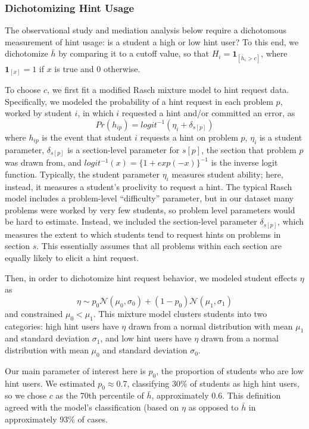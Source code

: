 \documentclass{article}\usepackage[]{graphicx}\usepackage[]{color}
\newcommand{\indicator}[1]{\mathbf{1}_{\left[ {#1} \right] }}
\begin{document}
\subsubsection{Dichotomizing Hint Usage}\label{sec:dichotomizingHintUsage}
The observational study and mediation analysis below require a dichotomous measurement of hint usage: is a
student a high or low hint user?
To this end, we dichotomize $\bar{h}$ by comparing it to a cutoff value, so
that $H_i=\indicator{\bar{h}_i>c}$, where $\indicator{x}=1$ if $x$ is true
and 0 otherwise.

To choose $c$, we first fit a modified Rasch mixture model
\citep{rasch} to hint request data.
Specifically, we modeled the probability of a hint request in each problem
$p$, worked by student $i$, in which $i$ requested a hint and/or
committed an error, as
\begin{equation}\label{eq:rasch}
Pr(h_{ip})=logit^{-1}(\eta_i+\delta_{s[p]})
\end{equation}
where $h_{ip}$ is the event that student $i$ requests a hint on
problem $p$, $\eta_i$ is a student parameter, $\delta_{s[p]}$ is a
section-level parameter for $s[p]$, the section that problem $p$ was
drawn from, and $logit^{-1}(x)=\{1+exp(-x)\}^{-1}$ is the inverse logit
function.
Typically, the student parameter $\eta_i$ measures student ability;
here, instead, it measures a student's proclivity to request a hint.
The typical Rasch model includes a problem-level ``difficulty'' parameter, but in our
dataset many problems were worked by very few students, so problem
level parameters would be hard to estimate.
Instead, we included the section-level parameter $\delta_{s[p]}$,
which measures the extent to which students tend to request hints on
problems in section $s$.
This essentially assumes that all problems within each section are equally
likely to elicit a hint request.

Then, in order to dichotomize hint request behavior, we modeled
student effects $\eta$ as
\begin{equation}\label{eq:mixture}
\eta\sim
p_0\mathcal{N}(\mu_0,\sigma_0)+(1-p_0)\mathcal{N}(\mu_1,\sigma_1)
\end{equation}
and constrained $\mu_0<\mu_1$.
This mixture model clusters students into two categories: high hint
users have $\eta$ drawn from a normal distribution with mean $\mu_1$
and standard deviation $\sigma_1$, and low hint users have $\eta$
drawn from a normal distribution with mean $\mu_0$ and standard
deviation $\sigma_0$.

Our main parameter of interest here is $p_0$, the proportion of
students who are low hint users.
We estimated $p_0\approx$0.7,
classifying 30\% of students as
high hint users, so we chose $c$ as the
70th percentile of $\bar{h}$,
approximately 0.6.
This definition agreed with the model's classification (based on
$\eta$ as opposed to $\bar{h}$ in
approximately 93\% of cases.
\end{document}

